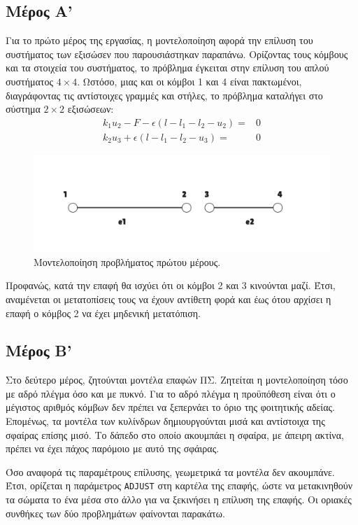 \documentclass{article}
\begin{document}
\subsection{Μέρος Α'}
Για το πρώτο μέρος της εργασίας, η μοντελοποίηση αφορά την επίλυση του συστήματος των εξισώσεν που παρουσιάστηκαν παραπάνω. Ορίζοντας τους κόμβους και τα στοιχεία του συστήματος, το πρόβλημα έγκειται στην επίλυση του απλού συστήματος $4\times 4$. Ωστόσο, μιας και οι κόμβοι 1 και 4 είναι πακτωμένοι, διαγράφοντας τις αντίστοιχες γραμμές και στήλες, το πρόβλημα καταλήγει στο σύστημα $2\times 2$ εξισώσεων:
\begin{align}
    k_1 u_2 - F - \epsilon (l-l_1-l_2-u_2) =& 0\\
    k_2 u_3 + \epsilon (l - l_1 -l_2 - u_3) =& 0
\end{align}

\begin{figure}[H]
    \centering
    \includegraphics[width=0.6\linewidth]{media/nodes.png}
    \caption{Μοντελοποίηση προβλήματος πρώτου μέρους.}
    \label{fig:nodes}
\end{figure}

Προφανώς, κατά την επαφή θα ισχύει ότι οι κόμβοι 2 και 3 κινούνται μαζί. Έτσι, αναμένεται οι μετατοπίσεις τους να έχουν αντίθετη φορά και έως ότου αρχίσει η επαφή ο κόμβος 2 να έχει μηδενική μετατόπιση.

\subsection{Μέρος Β'}
Στο δεύτερο μέρος, ζητούνται μοντέλα επαφών ΠΣ. Ζητείται η μοντελοποίηση τόσο με αδρό πλέγμα όσο και με πυκνό. Για το αδρό πλέγμα η προϋπόθεση είναι ότι ο μέγιστος αριθμός κόμβων δεν πρέπει να ξεπερνάει το όριο της φοιτητικής αδείας. Επομένως, τα μοντέλα των κυλίνδρων δημιουργούνται μισά και αντίστοιχα της σφαίρας επίσης μισό. Το δάπεδο στο οποίο ακουμπάει η σφαίρα, με άπειρη ακτίνα, πρέπει να έχει πάχος παρόμοιο με αυτό της σφάιρας.  
\par Όσο αναφορά τις παραμέτρους επίλυσης, γεωμετρικά τα μοντέλα δεν ακουμπάνε. Έτσι, ορίζεται η παράμετρος \texttt{ADJUST} στη καρτέλα της επαφής, ώστε να μετακινηθούν τα σώματα το ένα μέσα στο άλλο για να ξεκινήσει η επίλυση της επαφής. Οι οριακές συνθήκες των δύο προβλημάτων φαίνονται παρακάτω.
\end{document}
